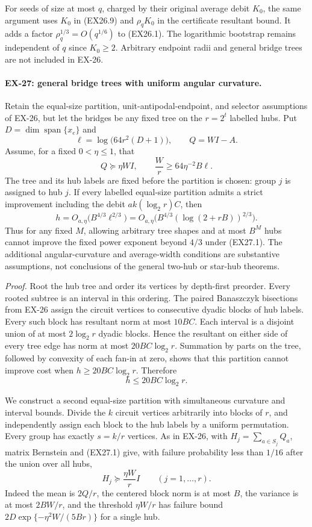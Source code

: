 For seeds of size at most $q$, charged by their original
average debit $K_0$, the same argument uses $K_0$ in (EX26.9)
and $\rho_qK_0$ in the certificate resultant bound.
It adds a factor $\rho_q^{1/3}=O(q^{1/6})$ to (EX26.1).
The logarithmic bootstrap remains independent of $q$ since
$K_0\ge2$. Arbitrary endpoint radii and general bridge trees
are not included in EX-26.

\paragraph{EX-27: general bridge trees with uniform angular curvature.}
Retain the equal-size partition, unit-antipodal-endpoint, and selector
assumptions of EX-26, but let the bridges be any fixed tree on the
$r=2^t$ labelled hubs. Put $D=\dim\operatorname{span}\{x_e\}$ and
\[
 \ell=\log\bigl(64r^2(D+1)\bigr),\qquad Q=WI-A.
\]
Assume, for a fixed $0<\eta\le1$, that
\[
 Q\succeq\eta WI,\qquad \frac Wr\ge64\eta^{-2}B\ell.
 \tag{EX27.1}
\]
The tree and its hub labels are fixed before the partition is chosen:
group $j$ is assigned to hub $j$. If every labelled equal-size
partition admits a strict improvement including
the debit $ak(\log_2r)C$, then
\[
 h=O_{a,\eta}\bigl(B^{4/3}\ell^{2/3}\bigr)
   =O_{a,\eta}\bigl(B^{4/3}(\log(2+rB))^{2/3}\bigr).
 \tag{EX27.2}
\]
Thus for any fixed $M$, allowing arbitrary tree shapes and at most
$B^M$ hubs cannot improve the fixed power exponent beyond $4/3$
under (EX27.1). The additional angular-curvature and average-width
conditions are substantive assumptions, not conclusions of the
general two-hub or star-hub theorems.

\emph{Proof.}
Root the hub tree and order its vertices by depth-first preorder.
Every rooted subtree is an interval in this ordering. The paired
Banaszczyk bisections from EX-26 assign the circuit vertices to
consecutive dyadic blocks of hub labels. Every such block has
resultant norm at most $10BC$. Each interval is a disjoint union
of at most $2\log_2r$ dyadic blocks. Hence the resultant on either
side of every tree edge has norm at most $20BC\log_2r$.
Summation by parts on the tree, followed by convexity of each
fan-in at zero, shows that this partition cannot improve cost
when $h\ge20BC\log_2r$. Therefore
\[
 h\le20BC\log_2r.
 \tag{EX27.3}
\]

We construct a second equal-size partition with simultaneous
curvature and interval bounds. Divide the $k$ circuit vertices
arbitrarily into blocks of $r$, and independently assign each
block to the hub labels by a uniform permutation. Every group
has exactly $s=k/r$ vertices. As in EX-26, with
$H_j=\sum_{a\in S_j}Q_a$, matrix Bernstein and (EX27.1) give,
with failure probability less than $1/16$ after the union over
all hubs,
\[
 H_j\succeq\frac{\eta W}{r}I\qquad(j=1,\ldots,r).
 \tag{EX27.4}
\]
Indeed the mean is $2Q/r$, the centered block norm is at most
$B$, the variance is at most $2BW/r$, and the threshold
$\eta W/r$ has failure bound
$2D\exp\{-\eta^2W/(5Br)\}$ for a single hub.

